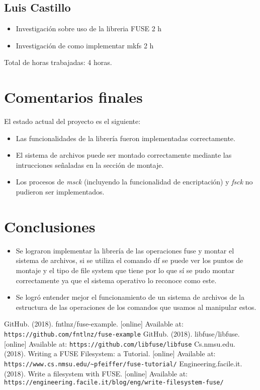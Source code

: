 \documentclass{article}
\begin{document}
\subsection{Luis Castillo}
\begin{itemize}
  \item Investigación sobre uso de la libreria FUSE 2 h
  \item Investigación de como implementar mkfs 2 h
\end{itemize}
Total de horas trabajadas: 4 horas.

\section{Comentarios finales}
  El estado actual del proyecto es el siguiente:
  \begin{itemize}
    \item Las funcionalidades de la librer\'ia fueron implementadas correctamente.
    \item El sistema de archivos puede ser montado correctamente mediante las intrucciones se\~naladas en la secci\'on de montaje.
    \item Los procesos de \emph{msck} (incluyendo la funcionalidad de encriptaci\'on) y \emph{fsck} no pudieron ser implementados.
  \end{itemize}

\section{Conclusiones}
\begin{itemize}
  \item Se lograron implementar la librería de las operaciones fuse y montar el sistema de archivos, si se utiliza el comando df se puede ver los puntos de montaje y el tipo de file system que tiene por lo que sí se pudo montar correctamente ya que el sistema operativo lo reconoce como este. 
  \item Se logró entender mejor el funcionamiento de un sistema de archivos de la estructura de las operaciones de los comandos que usamos al manipular estos. 
\end{itemize}

\begin{thebibliography}{99}
   GitHub. (2018). fntlnz/fuse-example. [online] Available at: \texttt{https://github.com/fntlnz/fuse-example}
   GitHub. (2018). libfuse/libfuse. [online] Available at: \texttt{https://github.com/libfuse/libfuse}
   Cs.nmsu.edu. (2018). Writing a FUSE Filesystem: a Tutorial. [online] Available at: \texttt{https://www.cs.nmsu.edu/\~{}pfeiffer/fuse-tutorial/}
   Engineering.facile.it. (2018). Write a filesystem with FUSE. [online] Available at: \texttt{https://engineering.facile.it/blog/eng/write-filesystem-fuse/}
\end{thebibliography}
\end{document}
